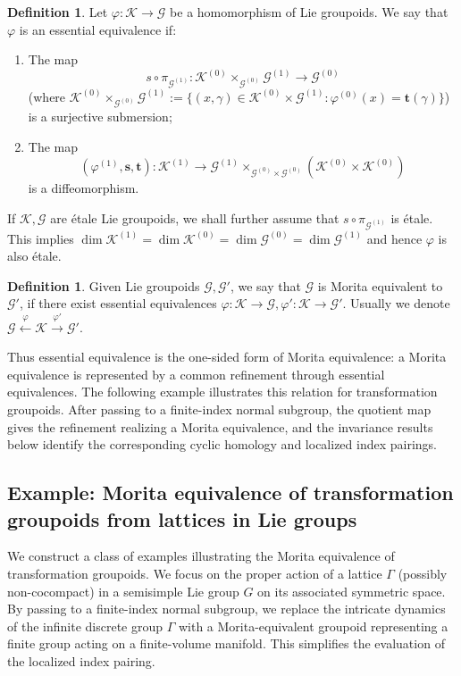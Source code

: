 \documentclass[a4paper]{amsart}
\newcommand{\maG}{\mathcal G}
\newcommand{\maK}{\mathcal K}
\newcommand{\bs}{\mathbf{s}}
\newcommand{\bt}{\mathbf{t}}
\newcommand\<{\langle}
\renewcommand\>{\rangle}
\theoremstyle{definition}
\newtheorem{dfn}[theorem]{Definition}
\theoremstyle{remark}
\begin{document}
\begin{dfn}
\label{EssEquivDfn}
Let $\varphi : \maK \to \maG$ be a homomorphism of Lie groupoids.
We say that $\varphi$ is an essential equivalence if:
\begin{enumerate}
\item
The map
$$ s \circ \pi _{\maG ^{(1)}} : \maK ^{(0)} \times _{\maG ^{(0)}} \maG ^{(1)} \to \maG ^{(0)} $$
(where $\maK ^{(0)} \times _{\maG ^{(0)}} \maG ^{(1)}
:= \{ (x, \gamma) \in \maK ^{(0)} \times \maG ^{(1)} : \varphi ^{(0)} (x) = \bt (\gamma) \} $)
is a surjective submersion;
\item
The map
$$ (\varphi ^{(1)} , \bs , \bt ) : \maK ^{(1)}
\to \maG ^{(1)} \times _{\maG ^{(0)} \times \maG ^{(0)}} (\maK ^{(0)} \times \maK ^{(0)}) $$
is a diffeomorphism.
\end{enumerate}
\end{dfn}

If $\maK, \maG$ are \'etale Lie groupoids, we shall further assume that $s \circ \pi _{\maG ^{(1)}}$ is \'etale.
This implies $\dim \maK ^{(1)} = \dim \maK ^{(0)} = \dim \maG ^{(0)} = \dim \maG ^{(1)} $ and hence $\varphi$ is also \'etale.

\begin{dfn}
Given Lie groupoids $\maG, \maG'$, we say that $\maG$ is Morita equivalent to $\maG'$,
if there exist essential equivalences $\varphi : \maK \to \maG, \varphi' : \maK \to \maG'$.
Usually we denote $\maG \xleftarrow{\varphi} \maK \xrightarrow{\varphi'} \maG'$.
\end{dfn}

Thus essential equivalence is the one-sided form of Morita equivalence:
a Morita equivalence is represented by a common refinement through essential equivalences.
The following example illustrates this relation for transformation groupoids.
After passing to a finite-index normal subgroup, the quotient map gives the refinement realizing a Morita equivalence,
and the invariance results below identify the corresponding cyclic homology and localized index pairings.

\subsection{Example: Morita equivalence of transformation groupoids from lattices in Lie groups}

We construct a class of examples illustrating the Morita equivalence of transformation groupoids.
We focus on the proper action of a lattice $\Gamma$ (possibly non-cocompact) in a semisimple Lie group $G$
on its associated symmetric space. By passing to a finite-index normal subgroup,
we replace the intricate dynamics of the infinite discrete group $\Gamma$
with a Morita-equivalent groupoid representing a finite group acting on a finite-volume manifold.
This simplifies the evaluation of the localized index pairing.
\end{document}
